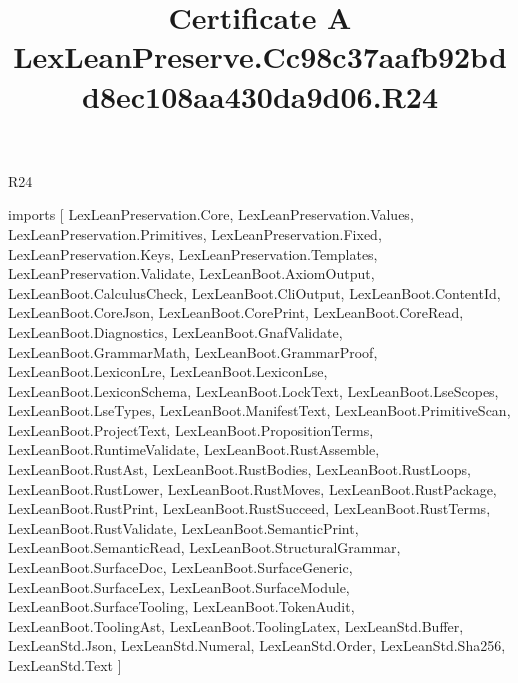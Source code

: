 \begin{lexlean}{R24}
\title{Certificate A LexLeanPreserve.Cc98c37aafb92bdd8ec108aa430da9d06.R24}
\begin{coremodule}
imports [
  LexLeanPreservation.Core,
  LexLeanPreservation.Values,
  LexLeanPreservation.Primitives,
  LexLeanPreservation.Fixed,
  LexLeanPreservation.Keys,
  LexLeanPreservation.Templates,
  LexLeanPreservation.Validate,
  LexLeanBoot.AxiomOutput,
  LexLeanBoot.CalculusCheck,
  LexLeanBoot.CliOutput,
  LexLeanBoot.ContentId,
  LexLeanBoot.CoreJson,
  LexLeanBoot.CorePrint,
  LexLeanBoot.CoreRead,
  LexLeanBoot.Diagnostics,
  LexLeanBoot.GnafValidate,
  LexLeanBoot.GrammarMath,
  LexLeanBoot.GrammarProof,
  LexLeanBoot.LexiconLre,
  LexLeanBoot.LexiconLse,
  LexLeanBoot.LexiconSchema,
  LexLeanBoot.LockText,
  LexLeanBoot.LseScopes,
  LexLeanBoot.LseTypes,
  LexLeanBoot.ManifestText,
  LexLeanBoot.PrimitiveScan,
  LexLeanBoot.ProjectText,
  LexLeanBoot.PropositionTerms,
  LexLeanBoot.RuntimeValidate,
  LexLeanBoot.RustAssemble,
  LexLeanBoot.RustAst,
  LexLeanBoot.RustBodies,
  LexLeanBoot.RustLoops,
  LexLeanBoot.RustLower,
  LexLeanBoot.RustMoves,
  LexLeanBoot.RustPackage,
  LexLeanBoot.RustPrint,
  LexLeanBoot.RustSucceed,
  LexLeanBoot.RustTerms,
  LexLeanBoot.RustValidate,
  LexLeanBoot.SemanticPrint,
  LexLeanBoot.SemanticRead,
  LexLeanBoot.StructuralGrammar,
  LexLeanBoot.SurfaceDoc,
  LexLeanBoot.SurfaceGeneric,
  LexLeanBoot.SurfaceLex,
  LexLeanBoot.SurfaceModule,
  LexLeanBoot.SurfaceTooling,
  LexLeanBoot.TokenAudit,
  LexLeanBoot.ToolingAst,
  LexLeanBoot.ToolingLatex,
  LexLeanStd.Buffer,
  LexLeanStd.Json,
  LexLeanStd.Numeral,
  LexLeanStd.Order,
  LexLeanStd.Sha256,
  LexLeanStd.Text
]


\end{coremodule}
\end{lexlean}
